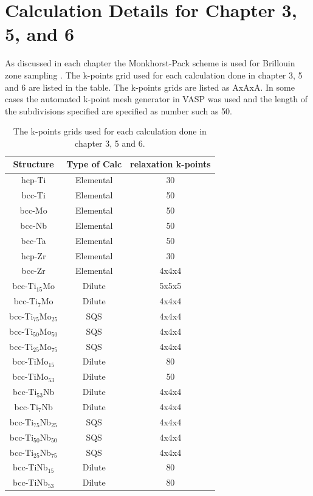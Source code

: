 
\section{Calculation Details for Chapter 3, 5, and 6}
As discussed in each chapter the Monkhorst-Pack scheme is used for Brillouin zone sampling \cite{Kresse1996,Monkhorst1976a}. The k-points grid used for each calculation done in chapter 3, 5 and 6 are listed in the table. The k-points grids are listed as AxAxA. In some cases the automated k-point mesh generator in VASP was used and the length of the subdivisions specified are specified as number such as 50. 

\begin{longtable}[H]{ c c c }
	\caption{The k-points grids used for each calculation done in chapter 3, 5 and 6.} \label{apc-table:kpoints}\\
	\hline
	Structure & Type of Calc & relaxation k-points\\
	\hline
	\endhead
	\hline
	\endfoot
	hcp-Ti & Elemental & 30 \\
	bcc-Ti & Elemental & 50 \\
	bcc-Mo & Elemental & 50 \\
	bcc-Nb & Elemental & 50 \\
	bcc-Ta & Elemental & 50 \\
	hcp-Zr & Elemental & 30 \\
	bcc-Zr & Elemental & 4x4x4 \\
	bcc-Ti$_{15}$Mo & Dilute & 5x5x5 \\
	bcc-Ti$_{7}$Mo & Dilute & 4x4x4\\
	bcc-Ti$_{75}$Mo$_{25}$ & SQS & 4x4x4\\
	bcc-Ti$_{50}$Mo$_{50}$ & SQS & 4x4x4\\
	bcc-Ti$_{25}$Mo$_{75}$ & SQS & 4x4x4\\
	bcc-TiMo$_{15}$ & Dilute & 80\\
	bcc-TiMo$_{53}$ & Dilute & 50\\
	bcc-Ti$_{53}$Nb & Dilute & 4x4x4\\
	bcc-Ti$_{7}$Nb & Dilute & 4x4x4\\ 
	bcc-Ti$_{75}$Nb$_{25}$ & SQS & 4x4x4\\
	bcc-Ti$_{50}$Nb$_{50}$ & SQS & 4x4x4\\
	bcc-Ti$_{25}$Nb$_{75}$ & SQS & 4x4x4\\
	bcc-TiNb$_{15}$ & Dilute & 80\\
	bcc-TiNb$_{53}$ & Dilute & 80\\

\end{longtable}

